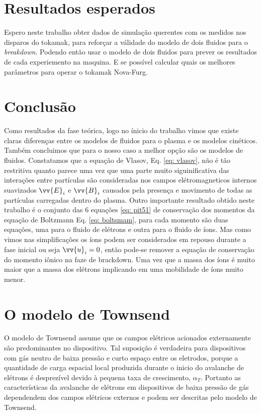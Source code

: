 \documentclass[12pt,oneside,a4paper]{abntex2}
\begin{document}
\chapter{Resultados esperados}
Espero neste trabalho obter dados de simulação querentes com os medidos nos disparos do tokamak, para reforçar a válidade do modelo de dois fluidos para o \textit{breakdown}. Podendo então usar o modelo de dois fluidos para prever os resultados de cada experiemento na maquina. E se possível calcular quais os melhores parâmetros para operar o tokamak Nova-Furg.

\chapter{Conclusão}
Como resultados da fase teórica, logo no ínicio do trabalho vimos que existe claras diferenças entre os modelos de fluidos para o plasma e os modelos cinéticos. Também concluimos que para o nosso caso a melhor opção são os modelos de fluidos. Constatamos que a equação de Vlasov, Eq. \ref{eq: vlasov}, não é tão restritiva quanto parece uma vez que uma parte muito siguinificativa das interações entre partículas são consideradas nos campos elétromagneticos  internos suavizados $\vv{E}_i$ e $\vv{B}_i$ causados pela presença e movimento de todas as partículas carregadas dentro do plasma. Outro importante resultado obtido neste trabalho é o conjunto das 6 equações \ref{eq: pit51} de conservação dos momentos da equação de Boltzmann Eq. \ref{eq: boltsmam}, para cada momento são duas equações, uma para o fluido de elétrons e outra para o fluido de íons. Mas como vimos nas simplificações os íons podem ser considerados em repouso durante a fase inicial ou seja $\vv{u}_i = 0$, então pode-se remover a equação de conservação do momento iônico na faze de brackdown. Uma vez que a massa dos íons é muito maior que a massa dos elétrons implicando em uma mobilidade de íons muito menor. 
\appendix  
\chapter{O modelo de Townsend}
\label{Townsend}
O modelo de Townsend assume que os campos elétricos acionados externamente são predominantes no dispositivo. Tal suposição é verdadeira para dispositivos com gás neutro de baixa pressão e curto espaço entre os eletrodos, porque a quantidade de carga espacial local produzida durante o inicio do avalanche de elétrons é desprezível devido à pequena taxa de crescimento, $\alpha_T$. Portanto as características da avalanche de elétrons em dispositivos de baixa pressão de gás dependendem dos campos elétricos externos e podem ser descritas pelo modelo de Townsend. 
\end{document}
